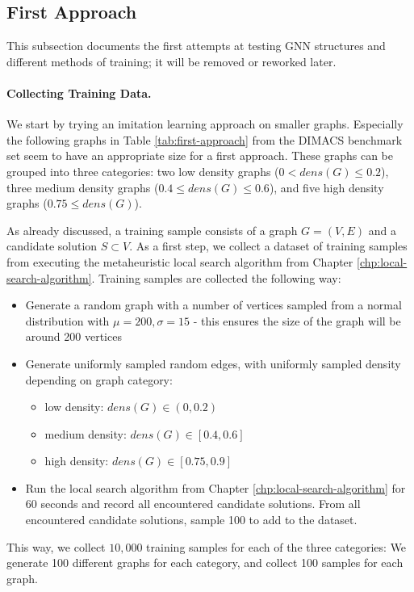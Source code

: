 \documentclass[draft,final]{vutinfth} %
\begin{document}
\subsection{First Approach}
This subsection documents the first attempts at testing GNN structures and different methods of training; it will be removed or reworked later.

\paragraph{Collecting Training Data.} We start by trying an imitation learning approach on smaller graphs. Especially the following graphs in Table \ref{tab:first-approach} from the DIMACS benchmark set seem to have an appropriate size for a first approach. 
These graphs can be grouped into three categories: two low density graphs ($0 < \mathit{dens}(G) \leq 0.2$), three medium density graphs ($0.4 \leq \mathit{dens}(G) \leq 0.6$), and five high density graphs ($0.75 \leq \mathit{dens}(G)$). 

As already discussed, a training sample consists of a graph $G = (V, E)$ and a candidate solution $S \subset V$. 
As a first step, we collect a dataset of training samples from executing the metaheuristic local search algorithm from Chapter \ref{chp:local-search-algorithm}. Training samples are collected the following way: 
\begin{itemize}
    \item Generate a random graph with a number of vertices sampled from a normal distribution with $\mu = 200, \sigma = 15$ - this ensures the size of the graph will be around 200 vertices
    \item Generate uniformly sampled random edges, with uniformly sampled density depending on graph category: 
    \begin{itemize}
        \item low density: $dens(G) \in (0, 0.2)$
        \item medium density: $dens(G) \in [0.4, 0.6]$
        \item high density: $dens(G) \in [0.75, 0.9]$
    \end{itemize}
    \item Run the local search algorithm from Chapter \ref{chp:local-search-algorithm} for 60 seconds and record all encountered candidate solutions. From all encountered candidate solutions, sample 100 to add to the dataset. 
\end{itemize}
This way, we collect $10,000$ training samples for each of the three categories: We generate 100 different graphs for each category, and collect 100 samples for each graph. 
\end{document}
